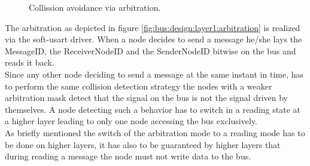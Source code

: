 \begin{figure}[h]
\begin{center}
\end{center}
\caption{Collission avoidance via arbitration.}
\end{figure}

The arbitration as depicted in figure \ref{fig:bus:design:layer1:arbitration} 
is realized via the soft-usart driver. 
When a node decides to send a message he/she lays the MessageID, 
the ReceiverNodeID and the SenderNodeID bitwise on the bus and reads it back.\\

Since any other node deciding to send a message at the same instant in time, 
has to perform the same collision detection strategy the nodes with a weaker 
arbitration mask detect that the signal on the bus is not the signal driven by themselves.
A node detecting such a behavior has to switch in a reading state 
at a higher layer leading to only one node accessing the bus exclusively.\\

As briefly mentioned the switch of the arbitration mode to a reading 
mode has to be done on higher layers, it has also to be guaranteed 
by higher layers that during reading a message the node must not write data to the bus.
